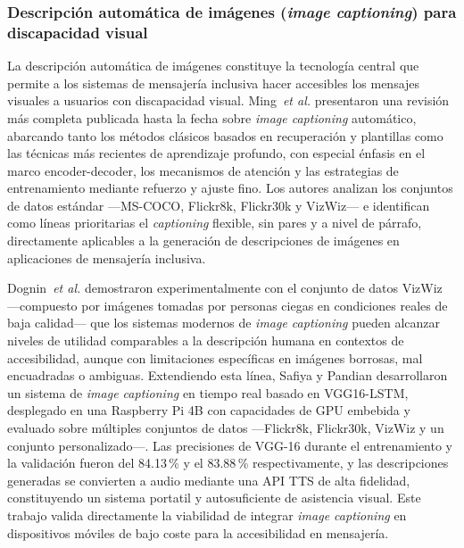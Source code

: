 \documentclass[journal]{IEEEtran}
\begin{document}
			\subsubsection{Descripci\'on autom\'atica de im\'agenes (\textit{image captioning}) para discapacidad visual}
				La descripci\'on autom\'atica de im\'agenes constituye la tecnolog\'ia central que permite a los sistemas de mensajer\'ia inclusiva hacer accesibles los mensajes visuales a usuarios con discapacidad visual. Ming~\textit{et al.} \cite{ming2022} presentaron una revisi\'on m\'as completa publicada hasta la fecha sobre \textit{image captioning} autom\'atico, abarcando tanto los m\'etodos cl\'asicos basados en recuperaci\'on y plantillas como las t\'ecnicas m\'as recientes de aprendizaje profundo, con especial \'enfasis en el marco encoder-decoder, los mecanismos de atenci\'on y las estrategias de entrenamiento mediante refuerzo y ajuste fino. Los autores analizan los conjuntos de datos est\'andar ---MS-COCO, Flickr8k, Flickr30k y VizWiz--- e identifican como l\'ineas prioritarias el \textit{captioning} flexible, sin pares y a nivel de p\'arrafo, directamente aplicables a la generaci\'on de descripciones de im\'agenes en aplicaciones de mensajer\'ia inclusiva.
				
				Dognin~\textit{et al.} \cite{dognin2021} demostraron experimentalmente con el conjunto de datos VizWiz ---compuesto por im\'agenes tomadas por personas ciegas en condiciones reales de baja calidad--- que los sistemas modernos de \textit{image captioning} pueden alcanzar niveles de utilidad comparables a la descripci\'on humana en contextos de accesibilidad, aunque con limitaciones espec\'ificas en im\'agenes borrosas, mal encuadradas o ambiguas. Extendiendo esta l\'inea, Safiya y Pandian \cite{safiya2024} desarrollaron un sistema de \textit{image captioning} en tiempo real basado en VGG16-LSTM, desplegado en una Raspberry Pi 4B con capacidades de GPU embebida y evaluado sobre m\'ultiples conjuntos de datos ---Flickr8k, Flickr30k, VizWiz y un conjunto personalizado---. Las precisiones de VGG-16 durante el entrenamiento y la validaci\'on fueron del 84.13\,\% y el 83.88\,\% respectivamente, y las descripciones generadas se convierten a audio mediante una API TTS de alta fidelidad, constituyendo un sistema portatil y autosuficiente de asistencia visual. Este trabajo valida directamente la viabilidad de integrar \textit{image captioning} en dispositivos m\'oviles de bajo coste para la accesibilidad en mensajer\'ia.
				
\end{document}
